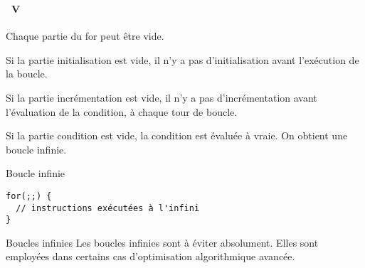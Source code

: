 \begin{frame}[containsverbatim]
  \frametitle{\secname}
  \framesubtitle{\subsecname~V}

  Chaque partie du for peut être vide.
  \par
  Si la partie initialisation est vide, il n'y a pas d'initialisation avant l'exécution de la boucle.
  \par
  Si la partie incrémentation est vide, il n'y a pas d'incrémentation avant l'évaluation de la condition, à chaque tour de boucle.
  \par
  Si la partie condition est vide, la condition est évaluée à vraie. On obtient une boucle infinie.
  
  {\small\begin{exampleblock}{Boucle infinie}
    \begin{verbatim}
for(;;) {
  // instructions exécutées à l'infini
}\end{verbatim}
  \end{exampleblock}}
  \begin{alertblock}{Boucles infinies}
    Les boucles infinies sont à éviter absolument. Elles sont employées dans certains cas d'optimisation algorithmique avancée.
  \end{alertblock}
\end{frame}

